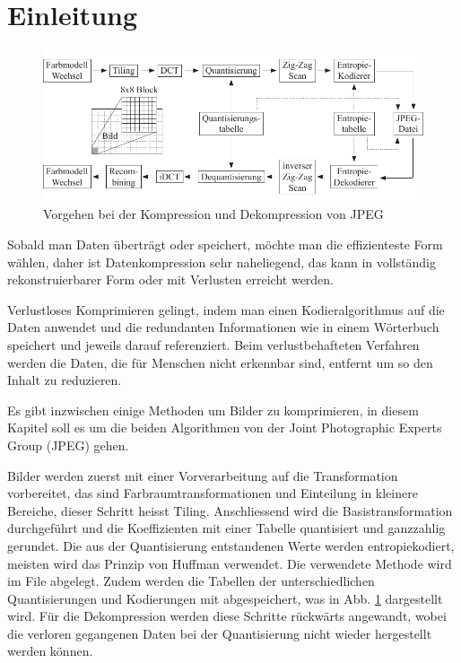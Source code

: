 %
%
%
%
\section{Einleitung\label{jpeg:section:einleitung}}
\begin{figure}
    \centering
    \includegraphics[width=\linewidth]{papers/jpeg/pictures/kompressionsschema.pdf}
    \caption{Vorgehen bei der Kompression und Dekompression von JPEG
        \label{jpeg:fig:kompressionsschema}}
\end{figure}
Sobald man Daten überträgt oder speichert, möchte man die effizienteste Form wählen, daher ist Datenkompression sehr naheliegend, das kann in vollständig rekonstruierbarer Form oder mit Verlusten erreicht werden.

Verlustloses Komprimieren gelingt, indem man einen Kodieralgorithmus auf die Daten anwendet und die redundanten Informationen wie in einem Wörterbuch speichert und jeweils darauf referenziert. Beim verlustbehafteten Verfahren werden die Daten, die für Menschen nicht erkennbar sind, entfernt um so den Inhalt zu reduzieren.

Es gibt inzwischen einige Methoden um Bilder zu komprimieren, in diesem Kapitel soll es um die beiden Algorithmen von der Joint Photographic Experts Group (JPEG) gehen.

Bilder werden zuerst mit einer Vorverarbeitung auf die Transformation vorbereitet, das sind Farb\-raumtransformationen und Einteilung in kleinere Bereiche, dieser Schritt heisst Tiling.
Anschliessend wird die Basistransformation durchgeführt und die Koeffizienten mit einer Tabelle quantisiert und ganzzahlig gerundet.
Die aus der Quantisierung entstandenen Werte werden entropiekodiert, meisten wird das Prinzip von Huffman verwendet.
Die verwendete Methode wird im File abgelegt.
Zudem werden die Tabellen der unterschiedlichen Quantisierungen und Kodierungen mit abgespeichert, was in Abb. \ref{jpeg:fig:kompressionsschema} dargestellt wird.
Für die Dekompression werden diese Schritte rückwärts angewandt, wobei die verloren gegangenen Daten bei der Quantisierung nicht wieder hergestellt werden können. 

